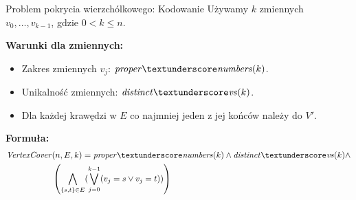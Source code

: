 \begin{frame}{Problem pokrycia wierzchólkowego: Kodowanie}
Używamy $k$ zmiennych $v_0,…,v_{k−1}$, gdzie $0 < k \leq n$.
\vspace{10pt}

\textbf{Warunki dla zmiennych:}
\vspace{5pt}
\begin{itemize}
	\item Zakres zmiennych $v_j$: $\propernumbers(k)$.
	\item Unikalność zmiennych: $\distinctvs(k)$.
	\item Dla każdej krawędzi w $E$ co najmniej jeden z jej końców należy do $V'$.
\end{itemize}
\vspace{10pt}

\textbf{Formuła:}
\begin{align*}
	\VertexCover&(n, E, k) = \propernumbers(k) \land \distinctvs(k) \land \\
	&\left( \bigwedge_{\{s,t\} \in E} (\bigvee_{j=0}^{k-1} (v_j = s \lor v_j = t)) \right)	
\end{align*}
\end{frame}